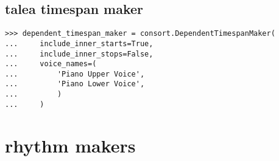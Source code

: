 \subsection{talea timespan maker}

\begin{comment}
<abjad>
timespan_maker = consort.TaleaTimespanMaker(
    initial_silence_talea=rhythmmakertools.Talea(
        counts=(0, 4),
        denominator=16,
        )
    )
</abjad>

\begin{singlespacing}
\begin{lstlisting}
>>> timespan_maker = consort.TaleaTimespanMaker(
...     initial_silence_talea=rhythmmakertools.Talea(
...         counts=(0, 4),
...         denominator=16,
...         )
...     )
\end{lstlisting}
\end{singlespacing}

- taleas: playing, silence and initial silence

- groupings

- synchronization

- repeat and reflect

\subsection{dependent timespan maker}

\begin{comment}
<abjad>
dependent_timespan_maker = consort.DependentTimespanMaker(
    include_inner_starts=True,
    include_inner_stops=False,
    voice_names=(
        'Piano Upper Voice',
        'Piano Lower Voice',
        )
    )
</abjad>
\end{comment}

\begin{singlespacing}
\begin{lstlisting}
>>> dependent_timespan_maker = consort.DependentTimespanMaker(
...     include_inner_starts=True,
...     include_inner_stops=False,
...     voice_names=(
...         'Piano Upper Voice',
...         'Piano Lower Voice',
...         )
...     )
\end{lstlisting}
\end{singlespacing}

\section{rhythm makers}

